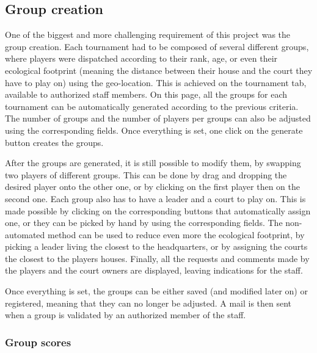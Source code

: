 \subsection{Group creation}
\label{sub:Group creation}


One of the biggest and more challenging requirement of this project was the
group creation. Each tournament had to be composed of several different groups,
where players were dispatched according to their rank, age, or even their
ecological footprint (meaning the distance between their house and the court
they have to play on) using the geo-location. This is achieved on the
tournament tab, available to authorized staff members. On this page, all the
groups for each tournament can be automatically generated according to the
previous criteria. The number of groups and the number of players per groups
can also be adjusted using the corresponding fields. Once everything is set,
one click on the generate button creates the groups. \newline

After the groups are generated, it is still possible to modify them, by
swapping two players of different groups. This can be done by drag and dropping
the desired player onto the other one, or by clicking on the first player then
on the second one. Each group also has to have a leader and a court to play on.
This is made possible by clicking on the corresponding buttons that
automatically assign one, or they can be picked by hand by using the
corresponding fields. The non-automated method can be used to reduce even more
the ecological footprint, by picking a leader living the closest to the
headquarters, or by assigning the courts the closest to the players houses.
Finally, all the requests and comments made by the players and the court owners
are displayed, leaving indications for the staff. \newline

Once everything is set, the groups can be either saved (and modified later on)
or registered, meaning that they can no longer be adjusted. A mail is then sent
when a group is validated by an authorized member of the staff.

\subsubsection{Group scores}
\label{subs:Group scores}


